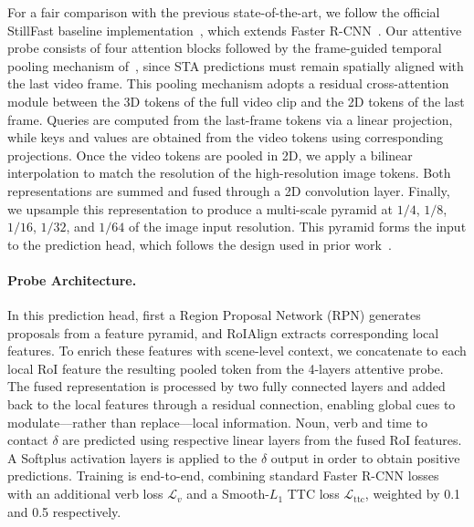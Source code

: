 \documentclass[]{fairmeta}
\begin{document}
For a fair comparison with the previous state-of-the-art, we follow the official StillFast baseline implementation~\citep{ragusa2023stillfast}, which extends Faster R-CNN~\citep{girshick2015fast}. 
Our attentive probe consists of four attention blocks followed by the frame-guided temporal pooling mechanism of~\citep{mur2024aff}, since STA predictions must remain spatially aligned with the last video frame.
This pooling mechanism adopts a residual cross-attention module between the 3D tokens of the full video clip and the 2D tokens of the last frame. Queries are computed from the last-frame tokens via a linear projection, while keys and values are obtained from the video tokens using corresponding projections.
Once the video tokens are pooled in 2D, we apply a bilinear interpolation to match the resolution of the high-resolution image tokens. Both representations are summed and fused through a 2D convolution layer. Finally, we upsample this representation to produce a multi-scale pyramid at $1/4$, $1/8$, $1/16$, $1/32$, and $1/64$ of the image input resolution. This pyramid forms the input to the prediction head, which follows the design used in prior work~\citep{ragusa2023stillfast, mur2024aff, thakur2023guided}.

\paragraph{\bf Probe Architecture.} In this prediction head, first a Region Proposal Network (RPN) generates proposals from a feature pyramid, and RoIAlign extracts corresponding local features. 
To enrich these features with scene-level context, we concatenate to each local RoI feature the resulting pooled token from the 4-layers attentive probe.
The fused representation is processed by two fully connected layers and added back to the local features through a residual connection, enabling global cues to modulate––rather than replace––local information.
Noun, verb and time to contact $\delta$ are predicted using respective linear layers from the fused RoI features. A Softplus activation layers is applied to the $\delta$ output in order to obtain positive predictions.
Training is end-to-end, combining standard Faster R-CNN losses with an additional verb loss $\mathcal{L}_v$ and a Smooth-$L_1$ TTC loss $\mathcal{L}_{\text{ttc}}$, weighted by 0.1 and 0.5 respectively. 
\end{document}
